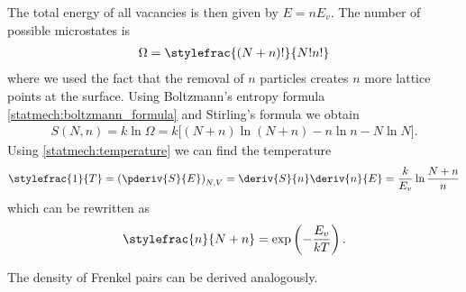     The total energy of all vacancies is then given by $E = nE_v$. The number of possible microstates is
    \begin{gather}
        \Omega = \stylefrac{(N+n)!}{N!n!}
    \end{gather}
    where we used the fact that the removal of $n$ particles creates $n$ more lattice points at the surface. Using Boltzmann's entropy formula \ref{statmech:boltzmann_formula} and Stirling's formula we obtain
    \begin{gather}
        S(N, n) = k\ln\Omega = k\big[(N+n)\ln(N+n) -n\ln n - N\ln N \big].
    \end{gather}
    Using \ref{statmech:temperature} we can find the temperature
    \begin{gather}
        \stylefrac{1}{T} = \left(\pderiv{S}{E}\right)_{N, V} = \deriv{S}{n}\deriv{n}{E} = \frac{k}{E_v}\ln\frac{N+n}{n}
    \end{gather}
    which can be rewritten as
    \begin{gather}
        \stylefrac{n}{N + n} = \exp\left(-\frac{E_v}{kT}\right).
    \end{gather}

    The density of Frenkel pairs can be derived analogously.